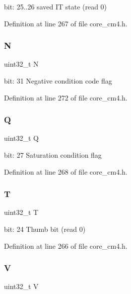 bit\+: 25..26 saved IT state (read 0) 

Definition at line 267 of file core\+\_\+cm4.\+h.

\mbox{\label{unionx_p_s_r___type_abae0610bc2a97bbf7f689e953e0b451f}} 
\subsubsection{\texorpdfstring{N}{N}}
{\footnotesize\ttfamily uint32\+\_\+t N}

bit\+: 31 Negative condition code flag 

Definition at line 272 of file core\+\_\+cm4.\+h.

\mbox{\label{unionx_p_s_r___type_a65f27ddc4f7e09c14ce7c5211b2e000a}} 
\subsubsection{\texorpdfstring{Q}{Q}}
{\footnotesize\ttfamily uint32\+\_\+t Q}

bit\+: 27 Saturation condition flag 

Definition at line 268 of file core\+\_\+cm4.\+h.

\mbox{\label{unionx_p_s_r___type_a6e1cf12e53a20224f6f62c001d9be972}} 
\subsubsection{\texorpdfstring{T}{T}}
{\footnotesize\ttfamily uint32\+\_\+t T}

bit\+: 24 Thumb bit (read 0) 

Definition at line 266 of file core\+\_\+cm4.\+h.

\mbox{\label{unionx_p_s_r___type_acd4a2b64faee91e4a9eef300667fa222}} 
\subsubsection{\texorpdfstring{V}{V}}
{\footnotesize\ttfamily uint32\+\_\+t V}

